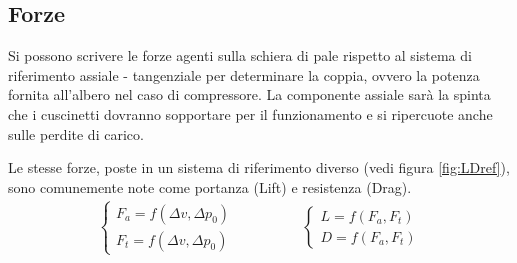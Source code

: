 \subsection{Forze}
Si possono scrivere le forze agenti sulla schiera di pale rispetto al sistema di riferimento assiale - tangenziale per determinare la coppia, ovvero la potenza fornita all'albero nel caso di compressore. La componente assiale sarà la spinta che i cuscinetti dovranno sopportare per il funzionamento e si ripercuote anche sulle perdite di carico.

Le stesse forze, poste in un sistema di riferimento diverso (vedi figura \ref{fig:LDref}), sono comunemente note come portanza (Lift) e resistenza (Drag).
\begin{align*}
	\begin{cases}
		F_a = f(\Delta v, \Delta p_0)\\
		F_t = f(\Delta v, \Delta p_0)
	\end{cases} \hspace{2cm}
	\begin{cases}
	L = f(F_a,F_t)\\
	D = f(F_a,F_t)
	\end{cases}
\end{align*}

